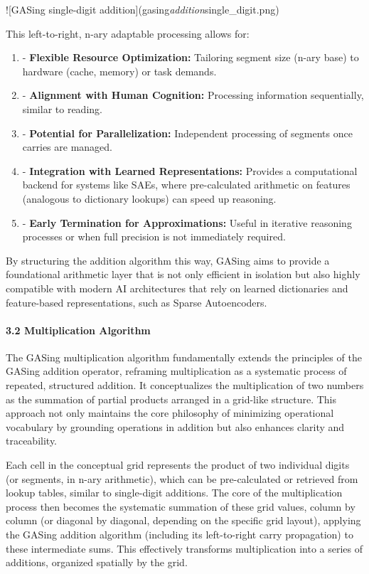 \documentclass[11pt,a4paper]{article}
\begin{document}
![GASing single-digit addition](gasing\emph{addition}single_digit.png)


This left-to-right, n-ary adaptable processing allows for:
\begin{enumerate}
  \item - \textbf{Flexible Resource Optimization:} Tailoring segment size (n-ary base) to hardware (cache, memory) or task demands.
  \item - \textbf{Alignment with Human Cognition:} Processing information sequentially, similar to reading.
  \item - \textbf{Potential for Parallelization:} Independent processing of segments once carries are managed.
  \item - \textbf{Integration with Learned Representations:} Provides a computational backend for systems like SAEs, where pre-calculated arithmetic on features (analogous to dictionary lookups) can speed up reasoning.
  \item - \textbf{Early Termination for Approximations:} Useful in iterative reasoning processes or when full precision is not immediately required.
\end{enumerate}

By structuring the addition algorithm this way, GASing aims to provide a foundational arithmetic layer that is not only efficient in isolation but also highly compatible with modern AI architectures that rely on learned dictionaries and feature-based representations, such as Sparse Autoencoders.

\paragraph{3.2 Multiplication Algorithm}
The GASing multiplication algorithm fundamentally extends the principles of the GASing addition operator, reframing multiplication as a systematic process of repeated, structured addition. It conceptualizes the multiplication of two numbers as the summation of partial products arranged in a grid-like structure. This approach not only maintains the core philosophy of minimizing operational vocabulary by grounding operations in addition but also enhances clarity and traceability.

Each cell in the conceptual grid represents the product of two individual digits (or segments, in n-ary arithmetic), which can be pre-calculated or retrieved from lookup tables, similar to single-digit additions. The core of the multiplication process then becomes the systematic summation of these grid values, column by column (or diagonal by diagonal, depending on the specific grid layout), applying the GASing addition algorithm (including its left-to-right carry propagation) to these intermediate sums. This effectively transforms multiplication into a series of additions, organized spatially by the grid.
\end{document}
